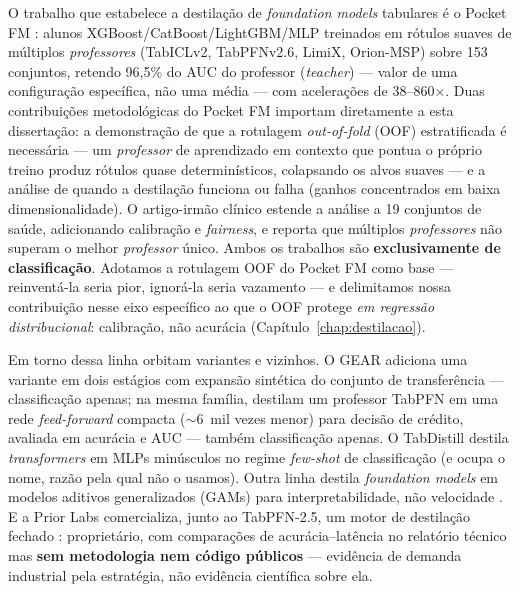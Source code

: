 O trabalho que
estabelece a destilação de \emph{foundation models} tabulares é o Pocket FM
\citep{pocketfm2026}: alunos XGBoost/CatBoost/LightGBM/MLP treinados em
rótulos suaves de múltiplos \emph{professores} (TabICLv2, TabPFNv2.6, LimiX,
Orion-MSP) sobre 153 conjuntos, retendo 96,5\% do AUC do professor
(\emph{teacher}) --- valor de uma configuração específica, não uma
média ---
com acelerações de 38--860$\times$. Duas contribuições metodológicas do
Pocket FM importam diretamente a esta dissertação: a demonstração de que a
rotulagem \emph{out-of-fold} (OOF) estratificada é necessária --- um
\emph{professor} de aprendizado em contexto que pontua o próprio treino
produz rótulos quase determinísticos, colapsando os alvos suaves --- e a
análise de quando a destilação funciona ou falha (ganhos concentrados em
baixa dimensionalidade). O artigo-irmão clínico \citep{pocketfmhealth2026}
estende a análise a 19 conjuntos de saúde, adicionando calibração e
\emph{fairness}, e reporta que múltiplos \emph{professores} não superam o
melhor \emph{professor} único. Ambos os trabalhos são \textbf{exclusivamente
de classificação}. Adotamos a rotulagem OOF do Pocket FM como base ---
reinventá-la seria pior, ignorá-la seria vazamento --- e delimitamos nossa
contribuição nesse eixo específico ao que o OOF protege \emph{em regressão
distribucional}: calibração, não acurácia
(Capítulo~\ref{chap:destilacao}).

Em torno dessa linha orbitam variantes e vizinhos. O GEAR
\citep{gear2026} adiciona uma
variante em dois estágios com expansão sintética do conjunto de
transferência --- classificação apenas; na mesma família, \citet{dey2026}
destilam um professor TabPFN em uma rede \emph{feed-forward} compacta
(${\sim}6$~mil vezes menor) para decisão de crédito, avaliada em
acurácia e AUC --- também classificação apenas. O TabDistill \citep{tabdistill2025}
destila \emph{transformers} em MLPs minúsculos no regime \emph{few-shot} de
classificação (e ocupa o nome, razão pela qual não o usamos). Outra linha
destila \emph{foundation models} em modelos aditivos generalizados (GAMs)
para interpretabilidade, não velocidade \citep{tfmgam2026}. E a Prior Labs
comercializa, junto ao TabPFN-2.5, um motor de destilação fechado
\citep{priorlabs2025}: proprietário, com comparações de
acurácia--latência no relatório técnico mas \textbf{sem metodologia nem
código públicos} --- evidência de demanda industrial pela estratégia, não
evidência científica sobre ela.

